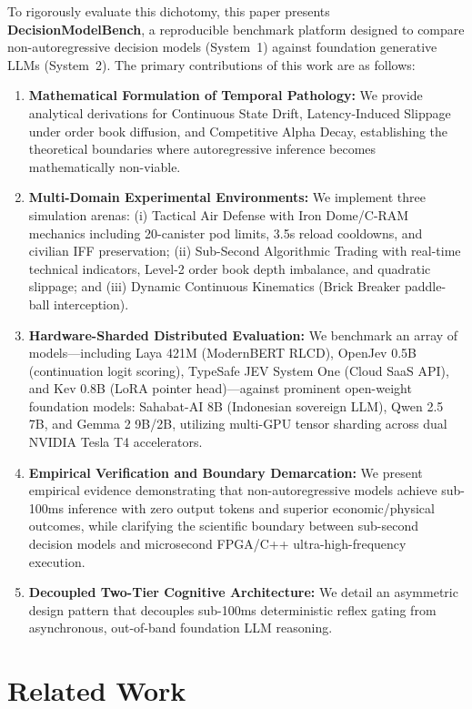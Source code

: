 \documentclass[journal,compsoc]{IEEEtran}
\begin{document}
To rigorously evaluate this dichotomy, this paper presents \textbf{DecisionModelBench}, a reproducible benchmark platform designed to compare non-autoregressive decision models (System~1) against foundation generative LLMs (System~2). The primary contributions of this work are as follows:
\begin{enumerate}
    \item \textbf{Mathematical Formulation of Temporal Pathology:} We provide analytical derivations for Continuous State Drift, Latency-Induced Slippage under order book diffusion, and Competitive Alpha Decay, establishing the theoretical boundaries where autoregressive inference becomes mathematically non-viable.
    \item \textbf{Multi-Domain Experimental Environments:} We implement three simulation arenas: (i) Tactical Air Defense with Iron Dome/C-RAM mechanics including 20-canister pod limits, 3.5s reload cooldowns, and civilian IFF preservation; (ii) Sub-Second Algorithmic Trading with real-time technical indicators, Level-2 order book depth imbalance, and quadratic slippage; and (iii) Dynamic Continuous Kinematics (Brick Breaker paddle-ball interception).
    \item \textbf{Hardware-Sharded Distributed Evaluation:} We benchmark an array of models---including Laya 421M (ModernBERT RLCD), OpenJev 0.5B (continuation logit scoring), TypeSafe JEV System One (Cloud SaaS API), and Kev 0.8B (LoRA pointer head)---against prominent open-weight foundation models: Sahabat-AI 8B (Indonesian sovereign LLM), Qwen 2.5 7B, and Gemma 2 9B/2B, utilizing multi-GPU tensor sharding across dual NVIDIA Tesla T4 accelerators.
    \item \textbf{Empirical Verification and Boundary Demarcation:} We present empirical evidence demonstrating that non-autoregressive models achieve sub-100ms inference with zero output tokens and superior economic/physical outcomes, while clarifying the scientific boundary between sub-second decision models and microsecond FPGA/C++ ultra-high-frequency execution.
    \item \textbf{Decoupled Two-Tier Cognitive Architecture:} We detail an asymmetric design pattern that decouples sub-100ms deterministic reflex gating from asynchronous, out-of-band foundation LLM reasoning.
\end{enumerate}

\section{Related Work}
\end{document}
